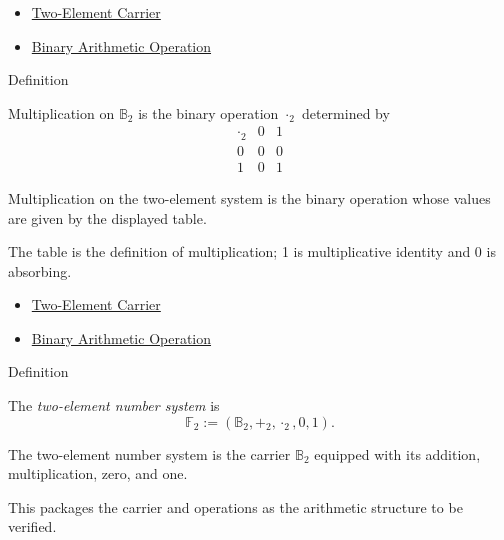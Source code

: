 \begin{dependencies}
\begin{itemize}
  \item \hyperref[def:two-element-carrier]{Two-Element Carrier}
  \item \hyperref[def:binary-arithmetic-operation]{Binary Arithmetic Operation}
\end{itemize}
\end{dependencies}

\begin{definitionbox}{Definition}
\begin{definition}
\label{def:multiplication-on-two-element-system}
Multiplication on \(\mathbb{B}_2\) is the binary operation \(\cdot_2\)
determined by
\[
\begin{array}{c|cc}
\cdot_2 & 0 & 1\\ \hline
0 & 0 & 0\\
1 & 0 & 1
\end{array}
\]
\end{definition}

\begin{remark*}
Multiplication on the two-element system is the binary operation whose values are given by the displayed table.
\end{remark*}

\begin{remark*}[Interpretation]
The table is the definition of multiplication; 1 is multiplicative identity and 0 is absorbing.
\end{remark*}
\end{definitionbox}

\begin{dependencies}
\begin{itemize}
  \item \hyperref[def:two-element-carrier]{Two-Element Carrier}
  \item \hyperref[def:binary-arithmetic-operation]{Binary Arithmetic Operation}
\end{itemize}
\end{dependencies}

\begin{definitionbox}{Definition}
\begin{definition}
\label{def:two-element-number-system}
The \emph{two-element number system} is
\[
\mathbb{F}_2:=(\mathbb{B}_2,+_2,\cdot_2,0,1).
\]
\end{definition}

\begin{remark*}
The two-element number system is the carrier \(\mathbb{B}_2\) equipped with its addition, multiplication, zero, and one.
\end{remark*}

\begin{remark*}[Interpretation]
This packages the carrier and operations as the arithmetic structure to be verified.
\end{remark*}
\end{definitionbox}

